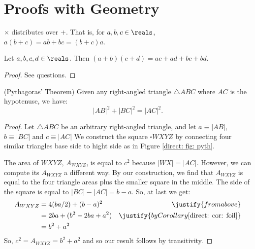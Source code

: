 \newcommand{\triabc}{{\triangle ABC}}
\newcommand{\squarewxyz}{\square{WXYZ}}
\section{Proofs with Geometry}

\begin{theorem}
    $\times$ distributes over $+$. That is, for $a, b, c \in \reals$,
    $a(b+c) = ab + bc = (b+c)a$.
\end{theorem}

\begin{corollary} \label{direct: cor: foil}
    Let $a, b, c, d \in \reals$. Then 
    $(a + b)(c + d) = ac + ad + bc + bd$.
\end{corollary}
\begin{proof}
    See questions.
\end{proof}


\begin{theorem} (Pythagoras' Theorem)
    Given any right-angled triangle $\triabc$ where $AC$ is 
    the hypotenuse, we have:
    $$|AB|^2 + |BC|^2 = |AC|^2.$$ 
\end{theorem}
\begin{proof}
    Let $\triabc$ be an arbitrary right-angled triangle, and let 
    $a \equiv |AB|$, $b \equiv |BC|$ and $c \equiv |AC|$ We
    construct the square $\square WXYZ$ by connecting four similar triangles
    base side to hight side as in Figure \ref{direct: fig: pyth}.

    The area of $WXYZ$, $A_{WXYZ}$, is equal to $c^2$ because 
    $|WX| = |AC|$. However, we can compute its $A_{WXYZ}$ a different way.
    By our  construction, we find that $A_{WXYZ}$ is equal to the four
    triangle areas plus the smaller square in the middle. The side of the
    square is equal to $|BC| - |AC| = b - a$. So, at last we get:  
    \begin{align}
        A_{WXYZ}   &= 4(ba / 2) + (b-a)^2 & \justify{from above} \\
                   &= 2ba + (b^2 - 2ba + a^2)
                     & \justify{by Corollary \ref{direct: cor: foil}} \\
                   &= b^2 + a^2
    \end{align}
    So, $c^2 = A_{WXYZ} = b^2 + a^2$ and so our result follows by transitivity.
\end{proof}

